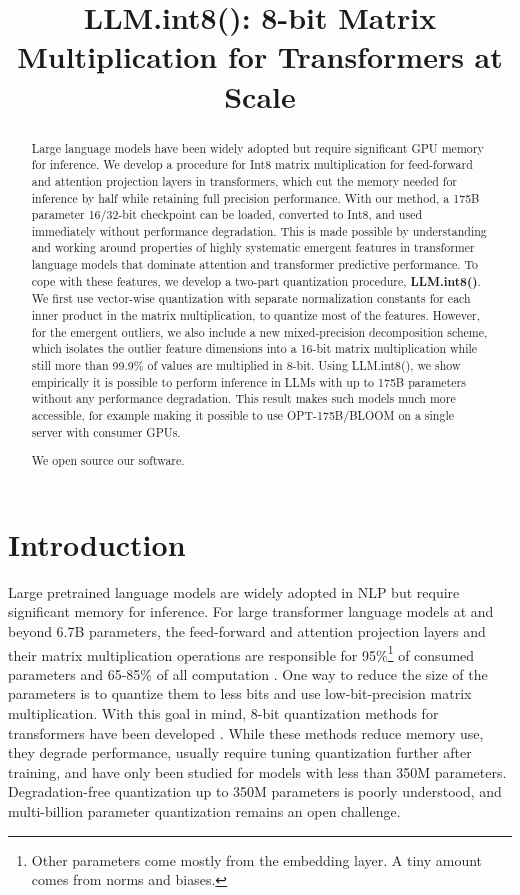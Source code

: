 \title{LLM.int8(): 8-bit Matrix Multiplication for Transformers at Scale}

\begin{abstract}
Large language models have been widely adopted but require significant GPU memory for inference. We develop a procedure for Int8 matrix multiplication for feed-forward and attention projection layers in transformers, which cut the memory needed for inference by half while retaining full precision performance. With our method, a 175B parameter 16/32-bit checkpoint can be loaded, converted to Int8, and used immediately without performance degradation. This is made possible by understanding and working around properties of highly systematic emergent features in transformer language models that dominate attention and transformer predictive performance. To cope with these features, we develop a two-part quantization procedure, {\bf LLM.int8()}. We first use vector-wise quantization with separate normalization constants for each inner product in the matrix multiplication, to quantize most of the features. However, for the emergent outliers, we also include a new mixed-precision decomposition scheme, which isolates the outlier feature dimensions into a 16-bit matrix multiplication while still more than 99.9\% of values are multiplied in 8-bit. Using LLM.int8(), we show empirically it is possible to perform inference in LLMs with up to 175B parameters without any performance degradation. This result makes such models much more accessible, for example making it possible to use OPT-175B/BLOOM on a single server with consumer GPUs.

We open source our software.
\end{abstract}

\section{Introduction}

Large pretrained language models are widely adopted in NLP \citep{vaswani2017attention,radford2019language, brown2020language, zhang2022opt} but require significant memory for inference. For large transformer language models at and beyond 6.7B parameters, the feed-forward and attention projection layers and their matrix multiplication operations are responsible for 95\%\footnote{Other parameters come mostly from the embedding layer. A tiny amount comes from norms and biases.} of consumed parameters and 65-85\% of all computation \citep{ilharco-etal-2020-high}. One way to reduce the size of the parameters is to quantize them to less bits and use low-bit-precision matrix multiplication. With this goal in mind, 8-bit quantization methods for transformers have been developed \citep{chen2020statistical, lin2020towards, zafrir2019q8bert,shen2020q}. While these methods reduce memory use, they degrade performance, usually require tuning quantization further after training, and have only been studied for models with less than 350M parameters. Degradation-free quantization up to 350M parameters is poorly understood, and multi-billion parameter quantization remains an open challenge.

